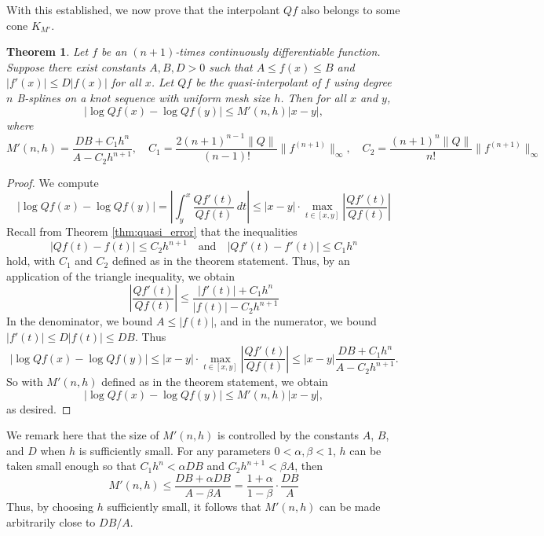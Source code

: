 \documentclass[10pt]{article}
\newtheorem{theorem}{Theorem}[section]
\theoremstyle{definition}
\numberwithin{equation}{section}
\numberwithin{figure}{section}
\numberwithin{table}{section}
\begin{document}
With this established, we now prove that the interpolant $Qf$ also belongs to some cone $K_{M'}$.
\begin{theorem}
Let $f$ be an $(n+1)$-times continuously differentiable function. Suppose there exist constants $A,B,D>0$ such that $A\leq f(x)\leq B$ and $|f'(x)|\leq D|f(x)|$ for all $x$. Let $Qf$ be the quasi-interpolant of $f$ using degree $n$ B-splines on a knot sequence with uniform mesh size $h$. Then for all $x$ and $y$,
$$|\log Qf(x)-\log Qf(y)|\leq M'(n,h)|x-y|,$$
where
$$M'(n,h)=\frac{DB+C_1h^n}{A-C_2h^{n+1}},\quad C_1=\frac{2(n+1)^{n-1}\|Q\|}{(n-1)!}\|f^{(n+1)}\|_\infty,\quad C_2=\frac{(n+1)^{n}\|Q\|}{n!}\|f^{(n+1)}\|_\infty$$
\label{thm:1D_cone}
\end{theorem}
\begin{proof}
We compute
$$|\log Qf(x)-\log Qf(y)|=\left|\int_y^x\frac{ Qf'(t)}{ Qf(t)}\,dt\right|\leq|x-y|\cdot\max_{t\in[x,y]}\left|\frac{ Qf'(t)}{ Qf(t)}\right|$$
Recall from Theorem \ref{thm:quasi_error} that the inequalities
$$| Qf(t)-f(t)|\leq C_2h^{n+1}\quad\text{and}\quad| Qf'(t)-f'(t)|\leq C_1h^n$$
hold, with $C_1$ and $C_2$ defined as in the theorem statement. Thus, by an application of the triangle inequality, we obtain
$$\left|\frac{ Qf'(t)}{ Qf(t)}\right|\leq\frac{|f'(t)|+C_1h^n}{|f(t)|-C_2h^{n+1}}$$
In the denominator, we bound $A\leq |f(t)|$, and in the numerator, we bound $|f'(t)|\leq D|f(t)|\leq DB$. Thus
$$|\log Qf(x)-\log Qf(y)|\leq|x-y|\cdot\max_{t\in[x,y]}\left|\frac{ Qf'(t)}{ Qf(t)}\right|\leq |x-y|\frac{DB+C_1h^n}{A-C_2h^{n+1}}.$$
So with $M'(n,h)$ defined as in the theorem statement, we obtain 
$$|\log Qf(x)-\log Qf(y)|\leq M'(n,h)|x-y|,$$
as desired.
\end{proof}

We remark here that the size of $M'(n,h)$ is controlled by the constants $A$, $B$, and $D$ when $h$ is sufficiently small. For any parameters $0<\alpha,\beta<1$, $h$ can be taken small enough so that $C_1h^n<\alpha DB$ and $C_2h^{n+1}<\beta A$, then
$$M'(n,h)\leq \frac{DB+\alpha DB}{A-\beta A}=\frac{1+\alpha}{1-\beta}\cdot\frac{DB}{A}$$
Thus, by choosing $h$ sufficiently small, it follows that $M'(n,h)$ can be made arbitrarily close to $DB/A$. 
\end{document}
